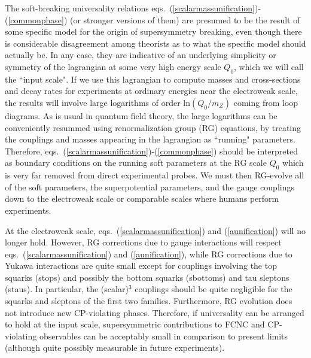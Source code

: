The soft-breaking universality
relations
eqs.~(\ref{scalarmassunification})-(\ref{commonphase})
(or stronger versions of them)
are presumed to be the result of some specific
model for the origin of supersymmetry breaking, even though there
is considerable disagreement among theorists as to what the specific
model should actually be. In any case, they are indicative of an
underlying simplicity or symmetry of the lagrangian at some very
high energy scale $Q_0$, which we will call the ``input scale".
If we use this lagrangian to compute masses and cross-sections and decay
rates for experiments at ordinary energies near the electroweak scale,
the results will involve large logarithms of order
ln$(Q_0/m_Z)$ coming from loop diagrams. As is usual in quantum field
theory, the
large
logarithms can be conveniently resummed using renormalization group
(RG) equations, by treating the couplings and masses appearing in the
lagrangian as ``running" parameters.
Therefore,
eqs.~(\ref{scalarmassunification})-(\ref{commonphase})
should be interpreted as boundary conditions on the running soft
parameters
at the RG scale $Q_0$ which is very far removed from direct experimental
probes.
We must then RG-evolve all of the soft parameters,
the superpotential parameters, and the gauge couplings down to
the electroweak scale or comparable scales where humans perform
experiments.

At the electroweak scale,
eqs.~(\ref{scalarmassunification}) and (\ref{aunification})
will no longer hold. However, RG corrections due to
gauge interactions will respect eqs.~(\ref{scalarmassunification})
and (\ref{aunification}), while RG corrections due to Yukawa
interactions are quite small except for couplings involving
the top squarks
(stops) and
possibly
the bottom squarks (sbottoms) and tau sleptons (staus). In particular,
the (scalar)$^3$ couplings should be quite negligible for the
squarks and sleptons of the first two families. Furthermore, RG evolution
does not introduce new CP-violating phases. Therefore, if universality can
be arranged to hold at the input scale, supersymmetric contributions to
FCNC and CP-violating observables can be acceptably small in comparison
to present limits (although quite possibly measurable
in future experiments).

